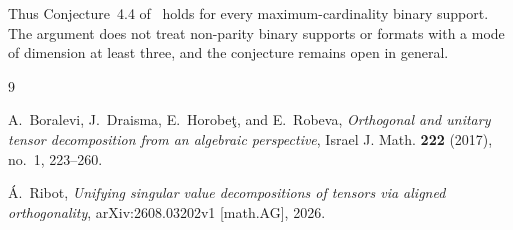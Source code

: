 \documentclass[11pt]{amsart}
\theoremstyle{remark}
\begin{document}
Thus Conjecture~4.4 of~\cite{Ribot} holds for every maximum-cardinality
binary support. The argument does not treat non-parity binary supports or
formats with a mode of dimension at least three, and the conjecture remains
open in general.

\begin{thebibliography}{9}

A.~Boralevi, J.~Draisma, E.~Horobe\c{t}, and E.~Robeva,
\emph{Orthogonal and unitary tensor decomposition from an algebraic
perspective},
Israel J. Math. \textbf{222} (2017), no.~1, 223--260.

\'A.~Ribot,
\emph{Unifying singular value decompositions of tensors via aligned
orthogonality},
arXiv:2608.03202v1 [math.AG], 2026.

\end{thebibliography}
\end{document}
